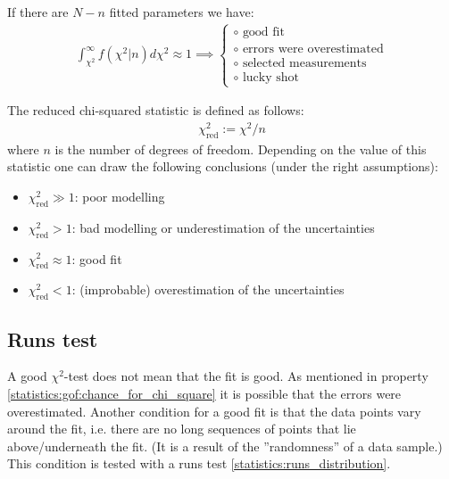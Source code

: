 {    \begin{property}
        If there are $N - n$ fitted parameters we have:
        \begin{gather}
            \label{statistics:gof:chance_for_chi_square}
            \int_{\chi^2}^\infty f\left(\chi^2|n\right)d\chi^2 \approx 1\implies
            \begin{cases}
                \circ\text{ good fit}\\
                \circ\text{ errors were overestimated}\\
                \circ\text{ selected measurements}\\
                \circ\text{ lucky shot}
            \end{cases}
        \end{gather}
    \end{property}
    \begin{property}
        The reduced chi-squared statistic is defined as follows:
        \begin{gather}
            \chi^2_{\text{red}} := \chi^2/n
        \end{gather}
        where $n$ is the number of degrees of freedom. Depending on the value of this statistic one can draw the following conclusions (under the right assumptions):
        \begin{itemize}
            \item $\chi^2_{\text{red}} \gg 1$: poor modelling
            \item $\chi^2_{\text{red}} > 1$: bad modelling or underestimation of the uncertainties
            \item $\chi^2_{\text{red}} \approx 1$: good fit
            \item $\chi^2_{\text{red}} < 1$: (improbable) overestimation of the uncertainties
        \end{itemize}
    \end{property}

\subsection{Runs test}

    A good $\chi^2$-test does not mean that the fit is good. As mentioned in property \ref{statistics:gof:chance_for_chi_square} it is possible that the errors were overestimated. Another condition for a good fit is that the data points vary around the fit, i.e. there are no long sequences of points that lie above/underneath the fit. (It is a result of the ''randomness'' of a data sample.) This condition is tested with a runs test \ref{statistics:runs_distribution}.

}
